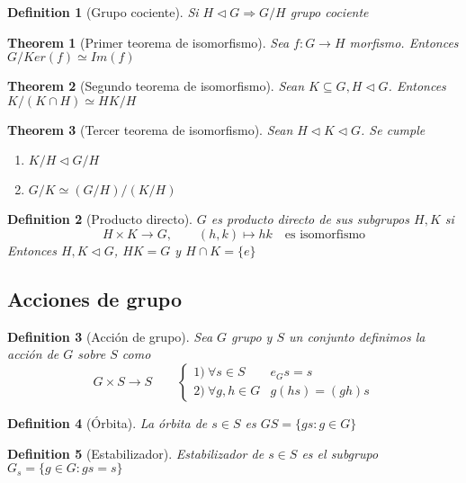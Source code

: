 \documentclass[leqno]{article}
\newtheorem*{theorem}{Theorem}
\newtheorem*{definition}{Definition}
\begin{document}
\begin{definition}[Grupo cociente] Si $H \triangleleft G \Rightarrow G / H$ grupo cociente
\end{definition}

\begin{theorem}[Primer teorema de isomorfismo] Sea $f: G \to H$ morfismo. Entonces $G / Ker(f) \simeq Im(f)$

\end{theorem}

\begin{theorem}[Segundo teorema de isomorfismo] Sean $K\subseteq G, H \triangleleft G$. Entonces $K / (K \cap H) \simeq HK /H$
\end{theorem}

\begin{theorem}[Tercer teorema de isomorfismo] Sean $H \triangleleft K \triangleleft G$. Se cumple
  \begin{enumerate}[topsep=-6pt, itemsep=0pt]
    \item $K/H \triangleleft G / H$
	\item $G / K \simeq (G / H)/ (K / H)$
  \end{enumerate}
\end{theorem}

\begin{definition}[Producto directo]$G$ es producto directo de sus subgrupos  $H, K$ si  
   \[
  H\times K \to G , \qquad (h, k) \mapsto hk \quad \text{es isomorfismo}
  \] 
  Entonces $H, K \triangleleft G$, $HK=G$ y  $H\cap K=\{e\}$
\end{definition}

\subsection{Acciones de grupo}
\begin{definition}[Acción de grupo] Sea $G$ grupo y $S$ un conjunto definimos la acción de $G$ sobre $S$ como
  \[
  G\times S \to S \qquad \begin{cases}
	1) \ \forall s\in S & e_Gs = s\\
	2) \ \forall g, h \in G & g(hs)=(gh)s 
  \end{cases}
  \] 
\end{definition}


\begin{definition}[Órbita] La órbita de $s\in S$ es $GS = \{gs:g\in G\}$
\end{definition}

\begin{definition}[Estabilizador] Estabilizador de  $s\in S$ es el subgrupo $G_s = \{g\in G: gs=s\}$
\end{definition}
\end{document}
